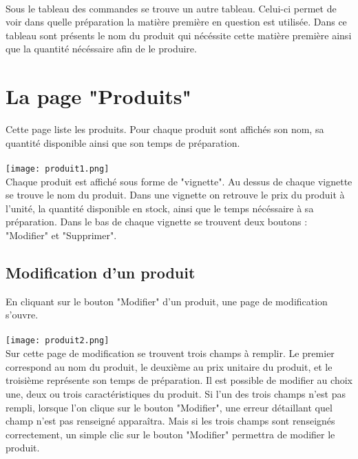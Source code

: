 \paragraph{}
Sous le tableau des commandes se trouve un autre tableau. Celui-ci permet de 
voir dans quelle préparation la matière première en question est utilisée. Dans 
ce tableau sont présents le nom du produit qui nécéssite cette matière première 
ainsi que la quantité nécéssaire afin de le produire.



\section{La page "Produits"}
Cette page liste les produits. Pour chaque produit sont affichés son nom, sa 
quantité disponible ainsi que son temps de préparation.

\paragraph{}
\texttt{[image: produit1.png]}\\
Chaque produit est affiché sous forme de "vignette". Au dessus de chaque 
vignette se trouve le nom du produit. Dans une vignette on retrouve le prix du 
produit à l'unité, la quantité disponible en stock, ainsi que le temps nécéssaire 
à sa préparation. Dans le bas de chaque vignette se trouvent deux boutons : 
"Modifier" et "Supprimer".

\subsection{Modification d'un produit}
En cliquant sur le bouton "Modifier" d'un produit, une page de modification 
s'ouvre. 

\paragraph{}
\texttt{[image: produit2.png]}\\
Sur cette page de modification se trouvent trois champs à remplir. 
Le premier correspond au nom du produit, le deuxième au prix unitaire du produit, 
et le troisième représente son temps de préparation. Il est possible de modifier 
au choix une, deux ou trois caractéristiques du produit. Si l'un des trois champs 
n'est pas rempli, lorsque l'on clique sur le bouton "Modifier", une erreur 
détaillant quel champ n'est pas renseigné apparaîtra. Mais si les trois champs 
sont renseignés correctement, un simple clic sur le bouton "Modifier" permettra 
de modifier le produit.


